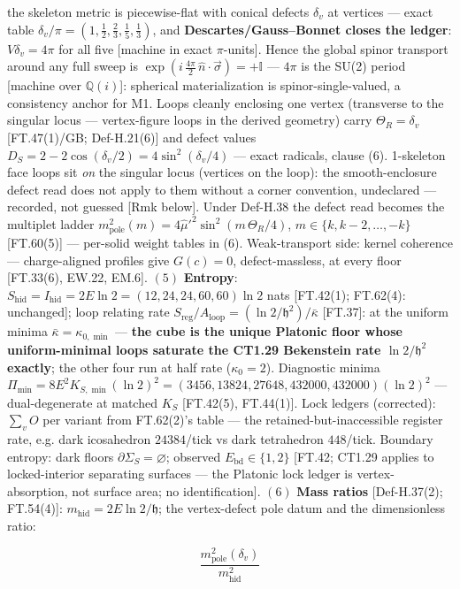 \begin{theorem}
the skeleton metric is piecewise-flat with conical defects $\delta_v$ at vertices — exact table $\delta_v/\pi=(1,\tfrac12,\tfrac23,\tfrac15,\tfrac13)$, and \textbf{Descartes/Gauss–Bonnet closes the ledger}: $V\delta_v=4\pi$ for all five [machine in exact $\pi$-units]. Hence the global spinor transport around any full sweep is $\exp(i\,\tfrac{4\pi}{2}\,\hat n\cdot\vec\sigma)=+\mathbb I$ — $4\pi$ is the SU(2) period [machine over $\mathbb Q(i)$]: spherical materialization is spinor-single-valued, a consistency anchor for M1. Loops cleanly enclosing one vertex (transverse to the singular locus — vertex-figure loops in the derived geometry) carry $\Theta_R=\delta_v$ [FT.47(1)/GB; Def-H.21(6)] and defect values $D_S=2-2\cos(\delta_v/2)=4\sin^2(\delta_v/4)$ — exact radicals, clause (6). 1-skeleton face loops sit \textit{on} the singular locus (vertices on the loop): the smooth-enclosure defect read does not apply to them without a corner convention, undeclared — recorded, not guessed [Rmk below]. Under Def-H.38 the defect read becomes the multiplet ladder $m^2_{\mathrm{pole}}(m)=4\hat\mu'^2\sin^2(m\,\Theta_R/4)$, $m\in\{k,k{-}2,\dots,-k\}$ [FT.60(5)] — per-solid weight tables in (6). Weak-transport side: kernel coherence — charge-aligned profiles give $G(c)=0$, defect-massless, at every floor [FT.33(6), EW.22, EM.6]. $(5)$ \textbf{Entropy}: $S_{\mathrm{hid}}=I_{\mathrm{hid}}=2E\ln2=(12,24,24,60,60)\ln2$ nats [FT.42(1); FT.62(4): unchanged]; loop relating rate $S_{\mathrm{reg}}/A_{\mathrm{loop}}=(\ln2/\mathfrak h^2)/\bar\kappa$ [FT.37]: at the uniform minima $\bar\kappa=\kappa_{0,\min}$ — \textbf{the cube is the unique Platonic floor whose uniform-minimal loops saturate the CT1.29 Bekenstein rate $\ln2/\mathfrak h^2$ exactly}; the other four run at half rate ($\kappa_0=2$). Diagnostic minima $\Pi_{\min}=8E^2K_{S,\min}(\ln2)^2=(3456,13824,27648,432000,432000)(\ln2)^2$ — dual-degenerate at matched $K_S$ [FT.42(5), FT.44(1)]. Lock ledgers (corrected): $\sum_vO$ per variant from FT.62(2)'s table — the retained-but-inaccessible register rate, e.g. dark icosahedron $24384$/tick vs dark tetrahedron $448$/tick. Boundary entropy: dark floors $\partial\Sigma_S=\varnothing$; observed $E_{\mathrm{bd}}\in\{1,2\}$ [FT.42; CT1.29 applies to locked-interior separating surfaces — the Platonic lock ledger is vertex-absorption, not surface area; no identification]. $(6)$ \textbf{Mass ratios} [Def-H.37(2); FT.54(4)]: $m_{\mathrm{hid}}=2E\ln2/\mathfrak h$; the vertex-defect pole datum and the dimensionless ratio:

\[
\frac{m^2_{\mathrm{pole}}(\delta_v)}{m_{\mathrm{hid}}^2}
\]


\end{theorem}
